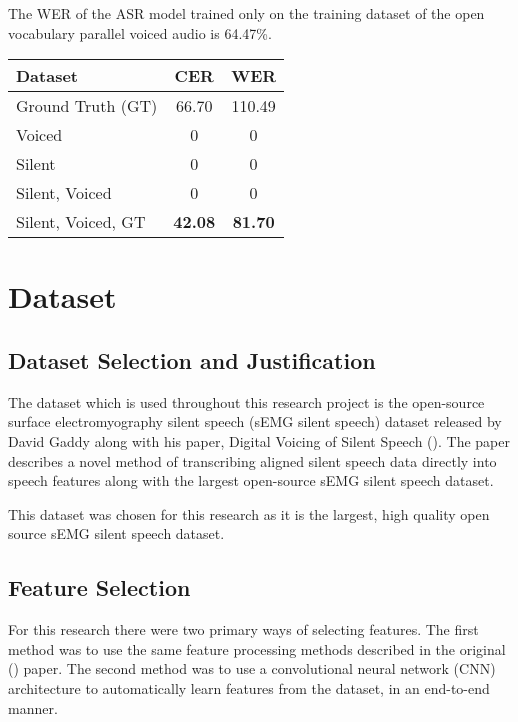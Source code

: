 The WER of the ASR model trained only on the
training dataset of the open vocabulary parallel voiced audio is 64.47\%.

{\small\begin{center}
\begin{tabular} {  l  c  c  }
\hline
\textbf{Dataset} & \textbf{CER} & \textbf{WER} \\
\hline
Ground Truth (GT) & 66.70 & 110.49 \\
Voiced & 0 & 0 \\
Silent & 0 & 0 \\
Silent, Voiced & 0 & 0 \\
\hline
Silent, Voiced, GT & \textbf{42.08} & \textbf{81.70} \\
\hline
\end{tabular}
\end{center}}

\iffalse

\section{Dataset}

\subsection{Dataset Selection and Justification}

The dataset which is used throughout this research project is the open-source
surface electromyography silent speech (sEMG silent speech) dataset released
by David Gaddy along with his paper, Digital Voicing of Silent Speech
(\cite{gaddy2020digital}).
The paper describes a novel method of transcribing aligned silent speech data
directly into speech features along with the largest open-source sEMG silent
speech dataset.

This dataset was chosen for this research as it is the largest, high quality open
source sEMG silent speech dataset.

\subsection{Feature Selection}

For this research there were two primary ways of selecting features. The first method
was to use the same feature processing methods described in the original
(\cite{gaddy2020digital}) paper. The second method was to use a convolutional
neural network (CNN) architecture to automatically learn features from the
dataset, in an end-to-end manner.


